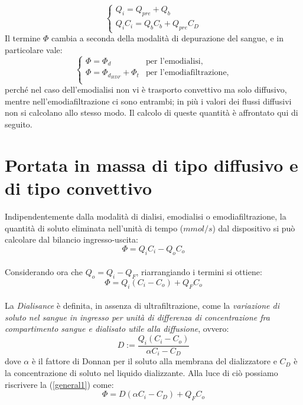 \begin{equation}\label{sistin}
	\left\{
		\begin{array}{l}
			Q_i =Q_{pre} + Q_b\\
			Q_iC_i =Q_bC_b + Q_{pre} C_D
		\end{array}
	\right.
\end{equation}
Il termine $\Phi$ cambia a seconda della modalità di depurazione del sangue, e in particolare vale:
\begin{equation*}
	\begin{cases}
	\Phi = \Phi_d & \text{per l'emodialisi,}\\
	\Phi = \Phi_{d_{HDF}} + \Phi_t & \text{per l'emodiafiltrazione,}\\
	\end{cases}
\end{equation*}
perché nel caso dell'emodialisi non vi è trasporto convettivo ma solo diffusivo, mentre nell'emodiafiltrazione ci sono entrambi; in più i valori dei flussi diffusivi non si calcolano allo stesso modo. Il calcolo di queste quantità è affrontato qui di seguito.\\

\section{Portata in massa di tipo diffusivo e  di tipo convettivo}
Indipendentemente dalla modalità di dialisi, emodialisi o emodiafiltrazione, la quantità di soluto eliminata nell'unità di tempo ($mmol/s$) dal dispositivo si può calcolare dal bilancio ingresso-uscita:\\
$$
\Phi = Q_i C_i - Q_o C_o
$$\\
Considerando ora che $Q_o = Q_i - Q_F$, riarrangiando i termini si ottiene:\\
\begin{equation}\label{general1}
\Phi = Q_i (C_i - C_o) + Q_F C_o
\end{equation}\\
La \textit{Dialisance} è definita, in assenza di ultrafiltrazione, come la \textit{variazione di soluto nel sangue in ingresso per unità di differenza di concentrazione fra compartimento sangue e dialisato utile alla diffusione}, ovvero:
\begin{equation*}
	D := \frac{Q_i(C_i-C_o)}{\alpha C_i - C_D}
\end{equation*}
dove $\alpha$ è il fattore di Donnan per il soluto alla membrana del dializzatore e $C_D$ è la concentrazione di soluto nel liquido dializzante. Alla luce di ciò possiamo riscrivere la (\ref{general1}) come:
\begin{equation}\label{general2}
	\Phi = D (\alpha C_i - C_D) + Q_F C_o
\end{equation}\\

